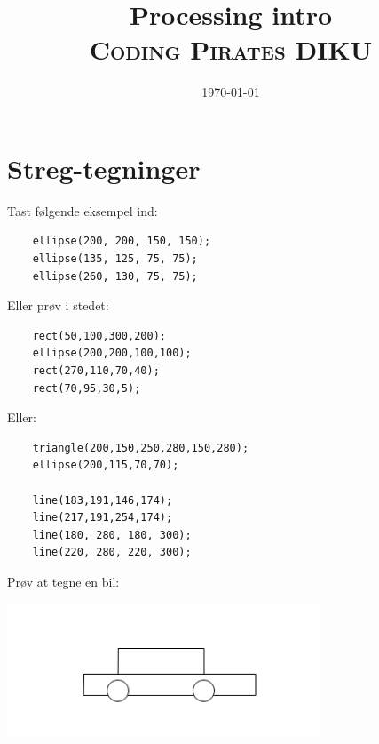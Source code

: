\documentclass[oneside,a4paper,10pts,article]{memoir}
\title{Processing intro
  \\ {\normalfont\small\scshape Coding Pirates DIKU }} \date{\today}
\begin{document}
\maketitle



\chapter{Streg-tegninger}
Tast følgende eksempel ind:
\begin{lstlisting}
    ellipse(200, 200, 150, 150);
    ellipse(135, 125, 75, 75);
    ellipse(260, 130, 75, 75);
\end{lstlisting}
Eller prøv i stedet:
\begin{lstlisting}
    rect(50,100,300,200);
    ellipse(200,200,100,100);
    rect(270,110,70,40);
    rect(70,95,30,5);
\end{lstlisting}
Eller:
\begin{lstlisting}
    triangle(200,150,250,280,150,280);
    ellipse(200,115,70,70);

    line(183,191,146,174);
    line(217,191,254,174);
    line(180, 280, 180, 300);
    line(220, 280, 220, 300);
\end{lstlisting}

\vspace{1cm}
\noindent
Prøv at tegne en bil:

\includegraphics[width=0.7\textwidth]{pics/bil-streg.png}
\end{document}
